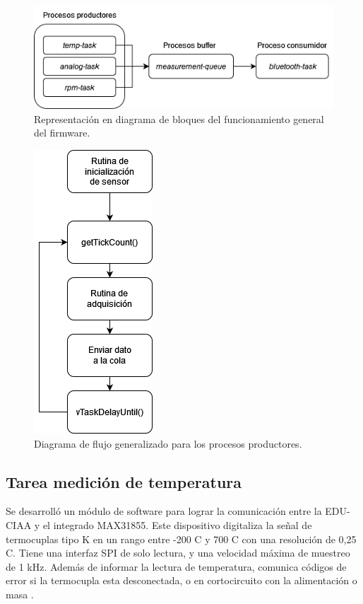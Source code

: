 \begin{figure}[htpb]
\centering
\includegraphics[width=1\textwidth]{./Figures/diagrama-firmware.png}
\caption{Representación en diagrama de bloques del funcionamiento general del firmware.}
\label{fig:diagrama-firmware}
\end{figure}

\begin{figure}[htpb]
\centering
\includegraphics[width=.25\textwidth]{./Figures/flujo-productor.png}
\caption{Diagrama de flujo generalizado para los procesos productores.}
\label{fig:flujo-productor}
\end{figure}

\break

\subsection{Tarea medición de temperatura}

Se desarrolló un módulo de software para lograr la comunicación entre la EDU-CIAA y el integrado MAX31855. Este dispositivo digitaliza la señal de termocuplas tipo K en un rango entre -200 \degree C y 700 \degree C con una resolución de 0,25 \degree C. Tiene una interfaz SPI de solo lectura, y una velocidad máxima de muestreo de 1 kHz. Además de informar la lectura de temperatura, comunica códigos de error si la termocupla esta desconectada, o en cortocircuito con la alimentación o masa \cite{MAX31855}. 

